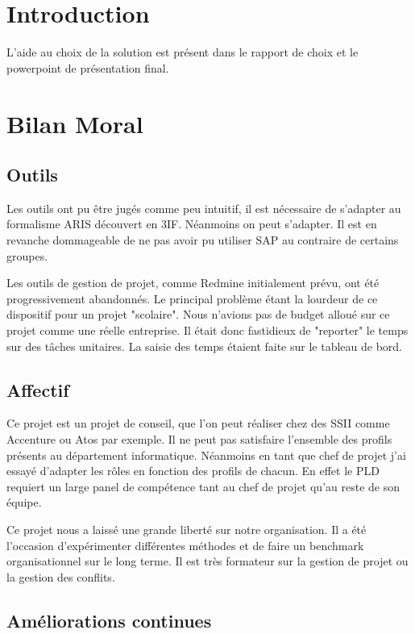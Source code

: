 \section{Introduction}

L'aide au choix de la solution est présent dans le rapport de choix et le powerpoint
de présentation final.

\section{Bilan Moral}

\subsection{Outils}

Les outils ont pu être jugés comme peu intuitif, il est nécessaire de s'adapter 
au formalisme ARIS découvert en 3IF. Néanmoins on peut s'adapter. Il est en revanche
 dommageable de ne pas avoir pu utiliser SAP au contraire de certains groupes. 

Les outils de gestion de projet, comme Redmine initialement prévu, ont été progressivement
 abandonnés. Le principal problème étant la lourdeur de ce dispositif pour un projet 
"scolaire". Nous n'avions pas de budget alloué sur ce projet comme une réelle entreprise.
Il était donc fastidieux de "reporter" le temps sur des tâches unitaires.
La saisie des temps étaient faite sur le tableau de bord.

\subsection{Affectif}

Ce projet est un projet de conseil, que l'on peut réaliser chez des SSII 
comme Accenture ou Atos par exemple. Il ne peut pas satisfaire l'ensemble des profils
présents au département informatique. Néanmoins en tant que chef de projet j'ai 
essayé d'adapter les rôles en fonction des profils de chacun. En effet le PLD 
requiert un large panel de compétence tant au chef de projet qu'au reste de son
équipe.

Ce projet nous a laissé une grande liberté sur notre organisation. 
Il a été l'occasion d'expérimenter différentes méthodes et de faire un benchmark 
organisationnel sur le long terme. Il est très formateur sur la gestion de projet ou
la gestion des conflits.

\subsection{Améliorations continues}

